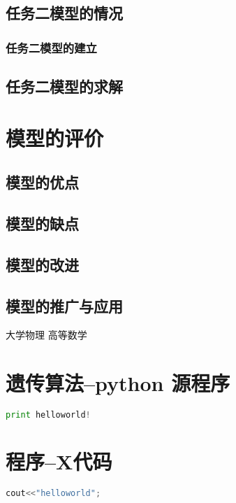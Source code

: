 \documentclass[withoutpreface,bwprint]{cumcmthesis} %
\begin{document}
\subsection{任务二模型的情况}
\subsubsection{任务二模型的建立}
\subsection{任务二模型的求解}

\section{模型的评价}
\subsection{模型的优点}
\subsection{模型的缺点}
\subsection{模型的改进}
\subsection{模型的推广与应用}
\begin{thebibliography}{9}%
  大学物理
  高等数学
\end{thebibliography}

\newpage
\begin{appendices}
\section{遗传算法--python 源程序}
\begin{lstlisting}[language=python]
print helloworld!
 \end{lstlisting}
 \section{程序--X代码}
\begin{lstlisting}[language=c]
cout<<"helloworld";
 \end{lstlisting}
\end{appendices}
\end{document}
